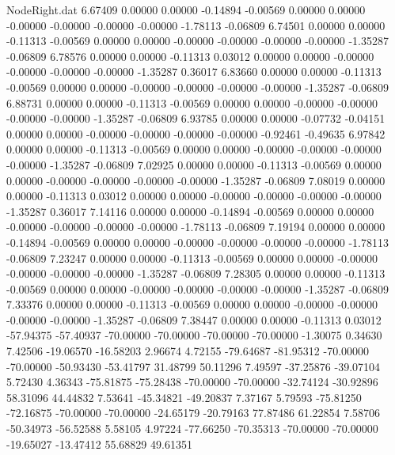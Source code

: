 \begin{filecontents}{NodeRight.dat}
   6.67409    0.00000    0.00000    -0.14894   -0.00569    0.00000    0.00000   -0.00000   -0.00000   -0.00000   -0.00000   -1.78113   -0.06809
   6.74501    0.00000    0.00000    -0.11313   -0.00569    0.00000    0.00000   -0.00000   -0.00000   -0.00000   -0.00000   -1.35287   -0.06809
   6.78576    0.00000    0.00000    -0.11313    0.03012    0.00000    0.00000   -0.00000   -0.00000   -0.00000   -0.00000   -1.35287    0.36017
   6.83660    0.00000    0.00000    -0.11313   -0.00569    0.00000    0.00000   -0.00000   -0.00000   -0.00000   -0.00000   -1.35287   -0.06809
   6.88731    0.00000    0.00000    -0.11313   -0.00569    0.00000    0.00000   -0.00000   -0.00000   -0.00000   -0.00000   -1.35287   -0.06809
   6.93785    0.00000    0.00000    -0.07732   -0.04151    0.00000    0.00000   -0.00000   -0.00000   -0.00000   -0.00000   -0.92461   -0.49635
   6.97842    0.00000    0.00000    -0.11313   -0.00569    0.00000    0.00000   -0.00000   -0.00000   -0.00000   -0.00000   -1.35287   -0.06809
   7.02925    0.00000    0.00000    -0.11313   -0.00569    0.00000    0.00000   -0.00000   -0.00000   -0.00000   -0.00000   -1.35287   -0.06809
   7.08019    0.00000    0.00000    -0.11313    0.03012    0.00000    0.00000   -0.00000   -0.00000   -0.00000   -0.00000   -1.35287    0.36017
   7.14116    0.00000    0.00000    -0.14894   -0.00569    0.00000    0.00000   -0.00000   -0.00000   -0.00000   -0.00000   -1.78113   -0.06809
   7.19194    0.00000    0.00000    -0.14894   -0.00569    0.00000    0.00000   -0.00000   -0.00000   -0.00000   -0.00000   -1.78113   -0.06809
   7.23247    0.00000    0.00000    -0.11313   -0.00569    0.00000    0.00000   -0.00000   -0.00000   -0.00000   -0.00000   -1.35287   -0.06809
   7.28305    0.00000    0.00000    -0.11313   -0.00569    0.00000    0.00000   -0.00000   -0.00000   -0.00000   -0.00000   -1.35287   -0.06809
   7.33376    0.00000    0.00000    -0.11313   -0.00569    0.00000    0.00000   -0.00000   -0.00000   -0.00000   -0.00000   -1.35287   -0.06809
   7.38447    0.00000    0.00000    -0.11313    0.03012  -57.94375  -57.40937  -70.00000  -70.00000  -70.00000  -70.00000   -1.30075    0.34630
   7.42506  -19.06570  -16.58203     2.96674    4.72155  -79.64687  -81.95312  -70.00000  -70.00000  -50.93430  -53.41797   31.48799   50.11296
   7.49597  -37.25876  -39.07104     5.72430    4.36343  -75.81875  -75.28438  -70.00000  -70.00000  -32.74124  -30.92896   58.31096   44.44832
   7.53641  -45.34821  -49.20837     7.37167    5.79593  -75.81250  -72.16875  -70.00000  -70.00000  -24.65179  -20.79163   77.87486   61.22854
   7.58706  -50.34973  -56.52588     5.58105    4.97224  -77.66250  -70.35313  -70.00000  -70.00000  -19.65027  -13.47412   55.68829   49.61351

\end{filecontents}
